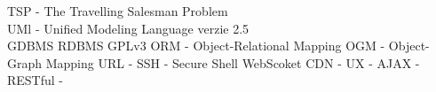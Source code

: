 TSP - The Travelling Salesman Problem\\
UMl - Unified Modeling Language verzie 2.5\\
GDBMS
RDBMS
GPLv3
ORM - Object-Relational Mapping
OGM - Object-Graph Mapping
URL - 
SSH - Secure Shell
WebScoket
CDN -
UX -
AJAX - 
RESTful -